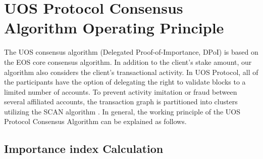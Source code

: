 \documentclass[a4paper,12pt]{article}
\begin{document}

\section{UOS Protocol Consensus Algorithm Operating Principle}

The UOS consensus algorithm (Delegated Proof-of-Importance, DPoI) is based on the EOS core consensus algorithm. In addition to the client's stake amount, our algorithm also considers the client's transactional activity. In UOS Protocol, all of the participants have the option of delegating the right to validate blocks to a limited number of accounts. To prevent activity imitation or fraud between several affiliated accounts, the transaction graph is partitioned into clusters utilizing the SCAN algorithm  \cite{SCAN}. In general, the working principle of the UOS Protocol Consensus Algorithm can be explained as follows.


\subsection{Importance index Calculation}
\end{document}
